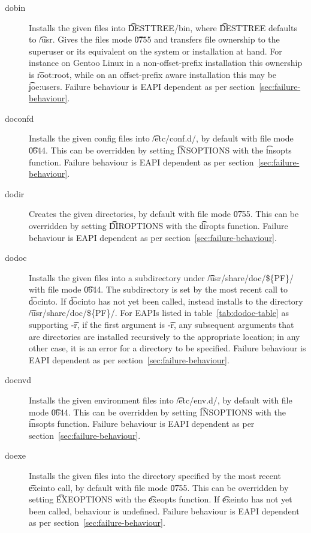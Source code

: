 \begin{description}
\item[dobin] Installs the given files into \t{DESTTREE/bin}, where
    \t{DESTTREE} defaults to \t{/usr}. Gives the files mode \t{0755}
    and transfers file ownership to the superuser or its equivalent on
    the system or installation at hand. For instance on Gentoo Linux in
    a non-offset-prefix installation this ownership is \t{root:root},
    while on an offset-prefix aware installation this may be
    \t{joe:users}. Failure behaviour is EAPI dependent as per
    section~\ref{sec:failure-behaviour}.

\item[doconfd] Installs the given config files into \t{/etc/conf.d/}, by default with file mode
    \t{0644}. This can be overridden by setting \t{INSOPTIONS} with the \t{insopts} function.
    Failure behaviour is EAPI dependent as per section~\ref{sec:failure-behaviour}.

\item[dodir] Creates the given directories, by default with file mode \t{0755}. This can be overridden
    by setting \t{DIROPTIONS} with the \t{diropts} function. Failure behaviour is EAPI dependent as
    per section~\ref{sec:failure-behaviour}.

\item[dodoc]  Installs the given files into a subdirectory under
    \t{/usr/share/doc/\$\{PF\}/} with file mode \t{0644}. The subdirectory is set by the most recent
    call to \t{docinto}. If \t{docinto} has not yet been called, instead installs to the directory
    \t{/usr/share/doc/\$\{PF\}/}. For EAPIs listed in table~\ref{tab:dodoc-table} as supporting \t{-r},
    if the first argument is \t{-r}, any subsequent arguments that are directories are installed
    recursively to the appropriate location; in any other case, it is an error for a directory to be
    specified. Failure behaviour is EAPI dependent as per section~\ref{sec:failure-behaviour}.

\item[doenvd] Installs the given environment files into \t{/etc/env.d/}, by default with file mode
    \t{0644}. This can be overridden by setting \t{INSOPTIONS} with the \t{insopts} function.
    Failure behaviour is EAPI dependent as per section~\ref{sec:failure-behaviour}.

\item[doexe] Installs the given files into the directory specified by the most recent \t{exeinto}
    call, by default with file mode \t{0755}. This can be overridden by setting \t{EXEOPTIONS} with
    the \t{exeopts} function. If \t{exeinto} has not yet been called, behaviour is undefined.
    Failure behaviour is EAPI dependent as per section~\ref{sec:failure-behaviour}.


\end{description}
